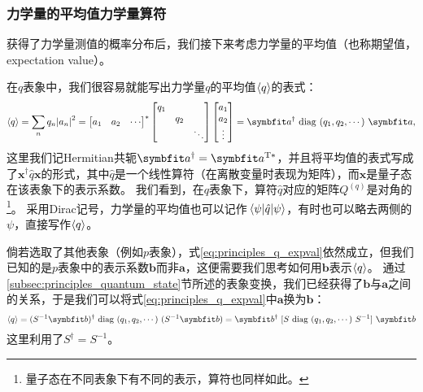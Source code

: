 \subsubsection{\texorpdfstring{力学量的平均值\quad 力学量算符}{力学量的平均值  力学量算符}}

获得了力学量测值的概率分布后，我们接下来考虑力学量的平均值（也称期望值，expectation value）。

在$q$表象中，我们很容易就能写出力学量$q$的平均值$\expval{q}$的表式：
\begin{equation}
    \label{eq:principles_q_expval}
    \expval{q} = \sum_n{q_n \abs{a_n}^2} =
    \begin{bmatrix}
        a_1 & a_2 & \cdots
    \end{bmatrix}^*
    \begin{bmatrix}
        q_1 \\ & q_2 \\ & & \ddots
    \end{bmatrix}
    \begin{bmatrix}
        a_1 \\ a_2 \\ \vdots
    \end{bmatrix}
    = \bm{a}^\dag\ \diag(q_1, q_2, \cdots)\ \bm{a},
\end{equation}
这里我们记Hermitian共轭$\bm{a}^\dag = \bm{a}^{\rm{T}*}$，并且将平均值的表式写成了$\bm{x}^\dag \hat{q} \bm{x}$的形式，其中$\hat{q}$是一个线性算符（在离散变量时表现为矩阵），而$\bm{x}$是量子态在该表象下的表示系数。
我们看到，在$q$表象下，算符$\hat{q}$对应的矩阵$Q^{(q)}$是对角的\footnote{量子态在不同表象下有不同的表示，算符也同样如此。}。
采用Dirac记号，力学量的平均值也可以记作$\mel{\psi}{\hat{q}}{\psi}$，有时也可以略去两侧的$\psi$，直接写作$\expval{q}$。

倘若选取了其他表象（例如$p$表象），式\eqref{eq:principles_q_expval}依然成立，但我们已知的是$p$表象中的表示系数$\bm{b}$而非$\bm{a}$，这便需要我们思考如何用$\bm{b}$表示$\expval{q}$。
通过\ref{subsec:principles_quantum_state}节所述的表象变换，我们已经获得了$\bm{b}$与$\bm{a}$之间的关系，于是我们可以将式\eqref{eq:principles_q_expval}中$\bm{a}$换为$\bm{b}$：
\begin{equation}
    \label{eq:principles_q_expval_p_rep}
    \expval{q}
    = (S^{-1} \bm{b})^\dag\ \diag(q_1, q_2, \cdots)\ (S^{-1} \bm{b})
    = \bm{b}^\dag\ [S\ \diag(q_1, q_2, \cdots)\ S^{-1}]\ \bm{b}
\end{equation}
这里利用了$S^\dag = S^{-1}$。

